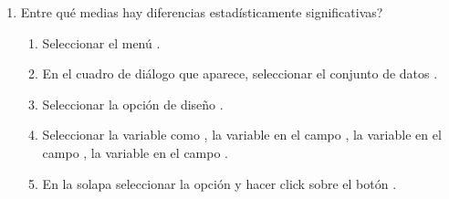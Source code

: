 \begin{enumerate}[leftmargin=*]
\begin{enumerate}
\item Entre qué medias hay diferencias estadísticamente significativas? 
\begin{indicacion}
\begin{enumerate}
\item Seleccionar el menú .
\item En el cuadro de diálogo que aparece, seleccionar el conjunto de datos .
\item Seleccionar la opción de diseño .
\item Seleccionar la variable  como , la variable
 en el campo , la variable  en el campo
, la variable  en el campo .
\item En la solapa  seleccionar la opción  y hacer
click sobre el botón .
\end{enumerate}
\end{indicacion}
\end{enumerate}
\end{enumerate}



